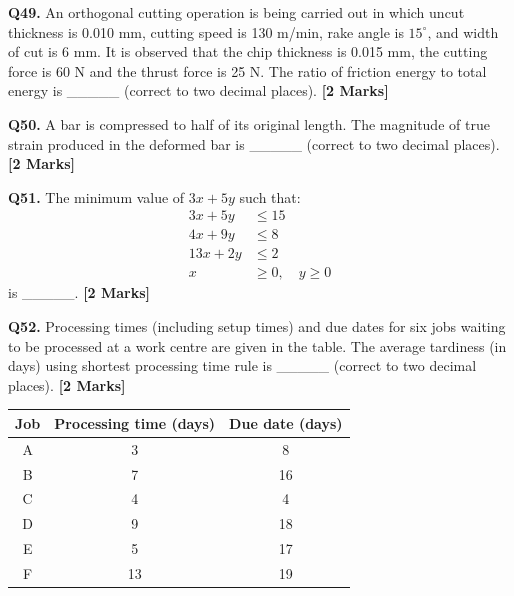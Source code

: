 \documentclass[11pt]{article}
\newcommand{\questionb}[2]{
    \noindent\textbf{Q#2.} #1 \hfill \textbf{[2 Marks]}
}
\begin{document}
\questionb{An orthogonal cutting operation is being carried out in which uncut thickness is 0.010 mm, cutting speed is 130 m/min, rake angle is \( 15^\circ \), and width of cut is 6 mm. It is observed that the chip thickness is 0.015 mm, the cutting force is 60 N and the thrust force is 25 N. The ratio of friction energy to total energy is \_\_\_\_\_ (correct to two decimal places).}{49}
\vspace{0.5cm}

\questionb{A bar is compressed to half of its original length. The magnitude of true strain produced in the deformed bar is \_\_\_\_\_ (correct to two decimal places).}{50}
\vspace{0.5cm}

\questionb{The minimum value of \( 3x + 5y \) such that: \\
\[
\begin{aligned}
3x + 5y &\leq 15 \\
4x + 9y &\leq 8 \\
13x + 2y &\leq 2 \\
x &\geq 0, \quad y \geq 0
\end{aligned}
\]
is \_\_\_\_\_.}{51}
\vspace{0.5cm}

\questionb{Processing times (including setup times) and due dates for six jobs waiting to be processed at a work centre are given in the table. The average tardiness (in days) using shortest processing time rule is \_\_\_\_\_ (correct to two decimal places).}{52}

\begin{center}
\begin{tabular}{|c|c|c|}
\hline
\textbf{Job} & \textbf{Processing time (days)} & \textbf{Due date (days)} \\
\hline
A & 3 & 8 \\
B & 7 & 16 \\
C & 4 & 4 \\
D & 9 & 18 \\
E & 5 & 17 \\
F & 13 & 19 \\
\hline
\end{tabular}
\end{center}
\vspace{0.5cm}
\end{document}
